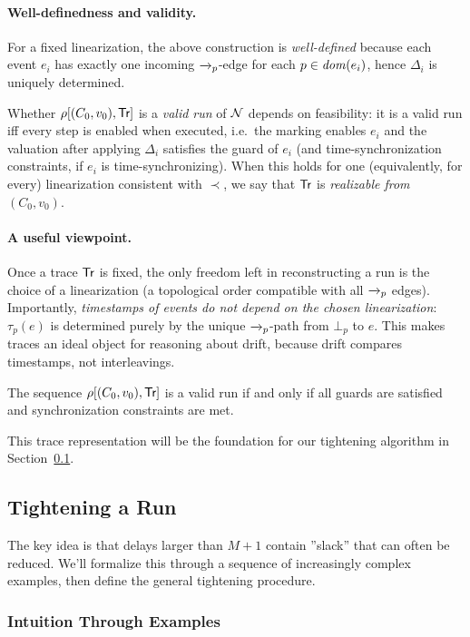 \paragraph{Well-definedness and validity.}
For a fixed linearization, the above construction is \emph{well-defined} because each event $e_i$ has exactly one incoming $\xrightarrow{}_p$-edge for each $p\in \mathit{dom}(e_i)$, hence $\Delta_i$ is uniquely determined.

Whether $\rho[(C_0,v_0),\textsf{Tr}]$ is a \emph{valid run} of $\mathcal{N}$ depends on feasibility:
it is a valid run iff every step is enabled when executed, i.e.\ the marking enables $e_i$ and the valuation after applying $\Delta_i$ satisfies the guard of $e_i$ (and time-synchronization constraints, if $e_i$ is time-synchronizing). When this holds for one (equivalently, for every) linearization consistent with $\prec$, we say that $\textsf{Tr}$ is \emph{realizable from $(C_0,v_0)$}.

\paragraph*{A useful viewpoint.}
Once a trace $\textsf{Tr}$ is fixed, the only freedom left in reconstructing a run is the choice of a linearization (a topological order compatible with all $\xrightarrow{}_p$ edges). Importantly, \emph{timestamps of events do not depend on the chosen linearization}: $\tau_p(e)$ is determined purely by the unique $\xrightarrow{}_p$-path from $\bot_p$ to $e$. This makes traces an ideal object for reasoning about drift, because drift compares timestamps, not interleavings.

The sequence $\rho[(C_0,v_0), \textsf{Tr}]$ is a valid run if and only if all guards are satisfied and synchronization constraints are met.

This trace representation will be the foundation for our tightening algorithm in Section~\ref{sec:tighten}.

\subsection{Tightening a Run}
\label{sec:tighten}

The key idea is that delays larger than $M+1$ contain ''slack'' that can often be reduced. We'll formalize this through a sequence of increasingly complex examples, then define the general tightening procedure.

\subsubsection{Intuition Through Examples}

